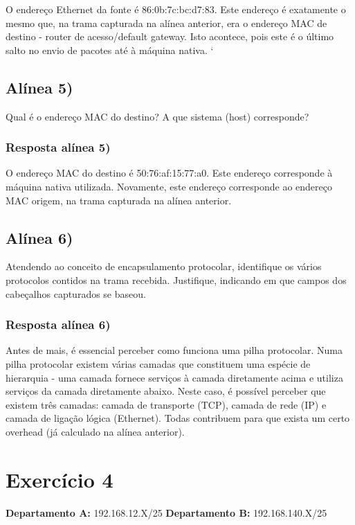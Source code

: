 \documentclass{article}
\begin{document}
O endereço Ethernet da fonte é 86:0b:7c:bc:d7:83. Este endereço é exatamente o mesmo que, na trama capturada na alínea anterior, era o endereço MAC de destino - router de acesso/default gateway. Isto acontece, pois este é o último salto no envio de pacotes até à máquina nativa.
`

\pagebreak
\subsection{Alínea 5)}

Qual é o endereço MAC do destino? A que sistema (host) corresponde?

\subsubsection{Resposta alínea 5)}

O endereço MAC do destino é 50:76:af:15:77:a0. Este endereço corresponde à máquina nativa utilizada. Novamente, este endereço corresponde ao endereço MAC origem, na trama capturada na alínea anterior.

\subsection{Alínea 6)}

Atendendo ao conceito de encapsulamento protocolar, identifique os vários protocolos contidos na trama recebida.
Justifique, indicando em que campos dos cabeçalhos capturados se baseou.

\subsubsection{Resposta alínea 6)}

Antes de mais, é essencial perceber como funciona uma pilha protocolar. Numa pilha protocolar existem várias camadas que constituem uma espécie de hierarquia - uma camada fornece serviços à camada diretamente acima e utiliza serviços da camada diretamente abaixo. Neste caso, é possível perceber que existem três camadas: camada de transporte (TCP), camada de rede (IP) e camada de ligação lógica (Ethernet). Todas contribuem para que exista um certo overhead (já calculado na alínea anterior).


\section{Exercício 4}
\textbf{Departamento A:} 192.168.12.X/25 
\textbf{Departamento B:} 192.168.140.X/25
\end{document}
